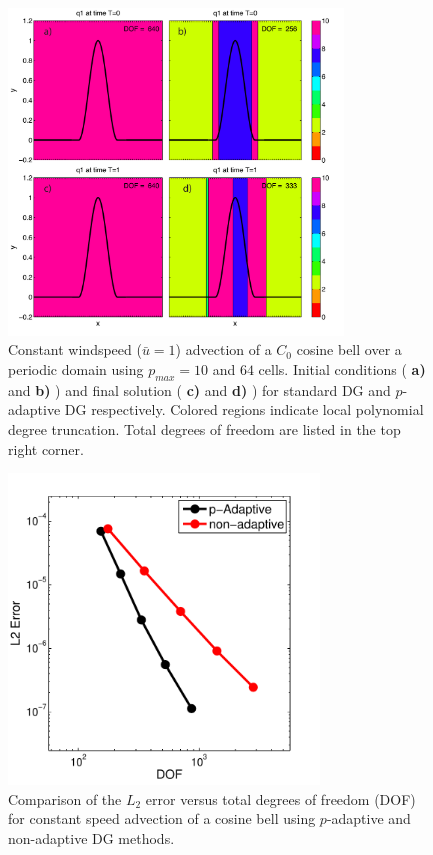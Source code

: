 \documentclass[10]{amsart}
\begin{document}
\begin{figure}
\hfil\includegraphics[width=3.5in]{figures/cosbellCmpre_E64N10.pdf}\hfil
\caption{Constant windspeed ($\bar u = 1$) advection of a $C_0$ cosine bell over a periodic domain using $p_{max} = 10$ and $64$ cells. Initial conditions ( {\bf a)} and {\bf b)} ) and final solution ( {\bf c)} and {\bf d)} ) for standard DG and $p$-adaptive DG respectively. Colored regions indicate local polynomial degree truncation. Total degrees of freedom are listed in the top right corner. } \label{cosbellCmpre}
\end{figure}

\begin{figure}
\hfil\includegraphics[width=3.25in]{figures/efficency.pdf}\hfil
\caption{Comparison of the $L_2$ error versus total degrees of freedom (DOF) for constant speed advection of a cosine bell using $p$-adaptive and non-adaptive DG methods. } \label{cosbellEfficiency}
\end{figure}
\end{document}
